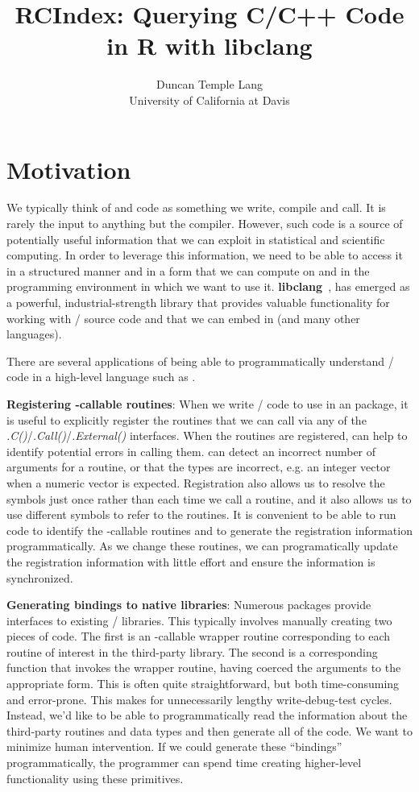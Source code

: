 \documentclass[article]{jss}
\author{Duncan Temple Lang\\University of California at Davis}
\title{RCIndex: Querying C/C++ Code in R with libclang}
\def\C{\proglang{C}}
\def\Cpp{\proglang{C$++$}}
\def\R{\proglang{R}}
\def\Rfunc#1{\textsl{#1()}}
\def\libclang{\textbf{libclang}}
\begin{document}

\section{Motivation}\label{sec:Introduction}

We typically think of \C{} and \Cpp{} code as something we write,
compile and call. It is rarely the input to anything but the compiler.
However, such code is a source of potentially useful information that
we can exploit in statistical and scientific computing.  In order to
leverage this information, we need to be able to access it in a
structured manner and in a form that we can compute on and in the
programming environment in which we want to use it.
\libclang{}~\cite{bib:libclang}, \cite{bib:libclangSlides} has
emerged as a powerful, industrial-strength library that provides
valuable functionality for working with \C/\Cpp{} source code and that
we can embed in \R{} (and many other languages).

There are several applications of being able to programmatically
understand \C/\Cpp{} code in a high-level language such as \R.

\textbf{Registering \R-callable routines}: When we write \C/\Cpp{}
code to use in an \R{} package, it is useful to explicitly register
the routines that we can call via any of the
\Rfunc{.C}/\Rfunc{.Call}/\Rfunc{.External} interfaces.  When the
routines are registered, \R{} can help to identify potential errors in
calling them.  \R{} can detect an incorrect number of arguments for a
routine, or that the types are incorrect, e.g. an integer vector when
a numeric vector is expected. Registration also allows us to resolve
the symbols just once rather than each time we call a routine, and it
also allows us to use different symbols to refer to the routines.  It
is convenient to be able to run \R{} code to identify the \R-callable
routines and to generate the registration information
programmatically.  As we change these routines, we can programatically
update the registration information with little effort and ensure the
information is synchronized.


\textbf{Generating bindings to native libraries}: Numerous \R{}
packages provide interfaces to existing \C/\Cpp{} libraries.  This
typically involves manually creating two pieces of code. The first is
an \R-callable wrapper routine corresponding to each routine of
interest in the third-party library. The second is a corresponding
\R{} function that invokes the wrapper routine, having coerced the
\R{} arguments to the appropriate form.  This is often quite
straightforward, but both time-consuming and error-prone.  This makes
for unnecessarily lengthy write-debug-test cycles.  Instead, we'd like
to be able to programmatically read the information about the
third-party routines and data types and then generate all of the code.
We want to minimize human intervention.  If we could generate these
``bindings'' programmatically, the \R{} programmer can spend time
creating higher-level functionality using these primitives.
\end{document}
